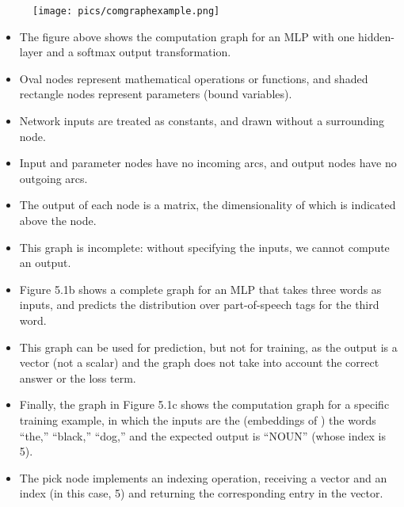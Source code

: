 \begin{figure}[htb]
	\centering
	 \texttt{[image: pics/comgraphexample.png]}
\end{figure}


\begin{itemize}

\item The figure above shows the computation graph for an MLP with one hidden-layer and a softmax output transformation.


\item Oval nodes represent mathematical operations or functions, and shaded rectangle nodes represent parameters (bound variables).

\item Network inputs are treated as constants, and drawn without a surrounding node. 

\item Input and parameter nodes have no incoming arcs, and output nodes have no outgoing arcs. 

\item The output of each node is a matrix, the dimensionality of which is indicated above the node.

\item This graph is incomplete: without specifying the inputs, we cannot compute an output.

\item Figure 5.1b shows a complete graph for an MLP that takes three words as inputs, and predicts the distribution over part-of-speech tags for the third word. 

\item This graph can be used for prediction, but not for training, as the output is a vector (not a scalar) and the graph does not take into account
the correct answer or the loss term. 

\item Finally, the graph in Figure 5.1c shows the computation graph for a specific training example, in which the inputs are the (embeddings of ) the words ``the,'' ``black,'' ``dog,'' and the expected output is ``NOUN'' (whose index is 5). 

\item The pick node implements an indexing operation, receiving a vector and an index (in this case, 5) and returning  the corresponding entry in the vector.


\end{itemize}


